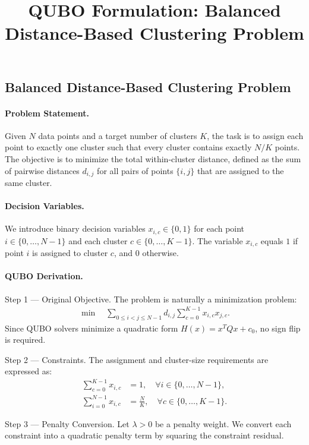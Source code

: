 \documentclass[12pt]{article}
\title{QUBO Formulation: Balanced Distance-Based Clustering Problem}
\date{}
\begin{document}
\maketitle

\subsection*{Balanced Distance-Based Clustering Problem}

\paragraph{Problem Statement.}
Given $N$ data points and a target number of clusters $K$, the task is to assign each point to exactly one cluster such that every cluster contains exactly $N/K$ points. The objective is to minimize the total within-cluster distance, defined as the sum of pairwise distances $d_{i,j}$ for all pairs of points $\{i,j\}$ that are assigned to the same cluster.

\paragraph{Decision Variables.}
We introduce binary decision variables $x_{i,c} \in \{0,1\}$ for each point $i \in \{0, \dots, N-1\}$ and each cluster $c \in \{0, \dots, K-1\}$. The variable $x_{i,c}$ equals $1$ if point $i$ is assigned to cluster $c$, and $0$ otherwise.

\paragraph{QUBO Derivation.}
Step 1 --- Original Objective. The problem is naturally a minimization problem:
\begin{align}
\min \quad \sum_{0 \le i < j \le N-1} d_{i,j} \sum_{c=0}^{K-1} x_{i,c} x_{j,c}.
\end{align}
Since QUBO solvers minimize a quadratic form $H(x) = x^T Q x + c_0$, no sign flip is required.

Step 2 --- Constraints. The assignment and cluster-size requirements are expressed as:
\begin{align}
\sum_{c=0}^{K-1} x_{i,c} &= 1, \quad \forall i \in \{0, \dots, N-1\}, \\
\sum_{i=0}^{N-1} x_{i,c} &= \frac{N}{K}, \quad \forall c \in \{0, \dots, K-1\}.
\end{align}

Step 3 --- Penalty Conversion. Let $\lambda > 0$ be a penalty weight. We convert each constraint into a quadratic penalty term by squaring the constraint residual.
\end{document}
